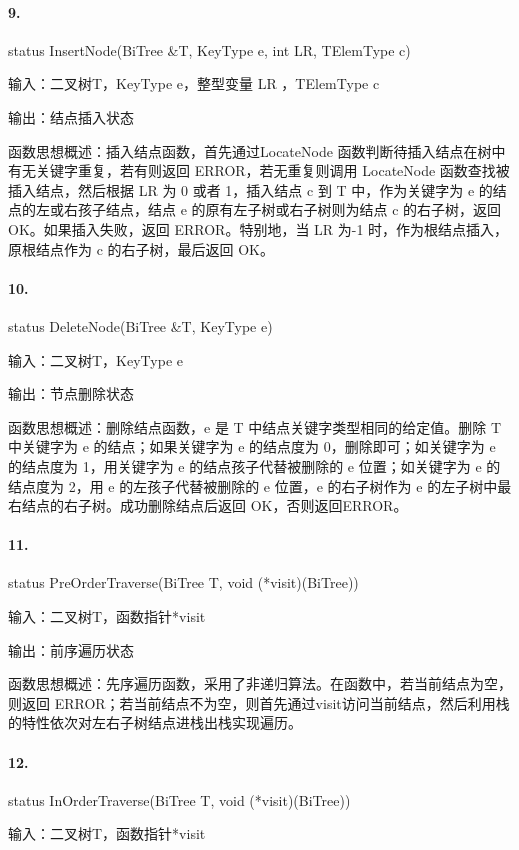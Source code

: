 \documentclass[supercite]{Experimental_Report}
\theoremstyle{definition}
\begin{document}
\paragraph{ 9.}status InsertNode(BiTree \&T, KeyType e, int LR, TElemType c)

输入：二叉树T，KeyType e，整型变量 LR ，TElemType c

输出：结点插入状态

函数思想概述：插入结点函数，首先通过LocateNode 函数判断待插入结点在树中有无关键字重复，若有则返回 ERROR，若无重复则调用 LocateNode 函数查找被插入结点，然后根据 LR 为 0 或者 1，插入结点 c 到 T 中，作为关键字为 e 的结点的左或右孩子结点，结点 e 的原有左子树或右子树则为结点 c 的右子树，返回 OK。如果插入失败，返回 ERROR。特别地，当 LR 为-1 时，作为根结点插入，原根结点作为 c 的右子树，最后返回 OK。

\paragraph{10.}status DeleteNode(BiTree \&T, KeyType e)

输入：二叉树T，KeyType e

输出：节点删除状态

函数思想概述：删除结点函数，e 是 T 中结点关键字类型相同的给定值。删除 T 中关键字为 e 的结点；如果关键字为 e 的结点度为 0，删除即可；如关键字为 e 的结点度为 1，用关键字为 e 的结点孩子代替被删除的 e 位置；如关键字为 e 的结点度为 2，用 e 的左孩子代替被删除的 e 位置，e 的右子树作为 e 的左子树中最右结点的右子树。成功删除结点后返回 OK，否则返回ERROR。

\paragraph{11.}status PreOrderTraverse(BiTree T, void (*visit)(BiTree))

输入：二叉树T，函数指针*visit

输出：前序遍历状态

函数思想概述：先序遍历函数，采用了非递归算法。在函数中，若当前结点为空，则返回 ERROR；若当前结点不为空，则首先通过visit访问当前结点，然后利用栈的特性依次对左右子树结点进栈出栈实现遍历。

\paragraph{12.}status InOrderTraverse(BiTree T, void (*visit)(BiTree))

输入：二叉树T，函数指针*visit
\end{document}
